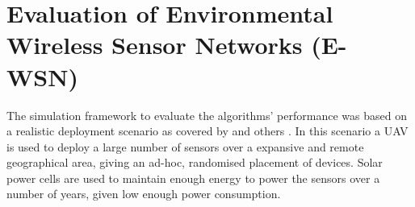 \section{Evaluation of Environmental Wireless Sensor Networks (E-WSN)}
\label{section:experimental}	
The simulation framework to evaluate the algorithms' performance was based on a realistic deployment scenario as covered by  \cite{Gomez2015} and others \cite{Jha2016, Avram}. In this scenario a UAV is used to deploy a large number of sensors over a expansive and remote geographical area, giving an ad-hoc, randomised placement of devices. Solar power cells are used to maintain enough energy to power the sensors over a number of years, given low enough power consumption.



